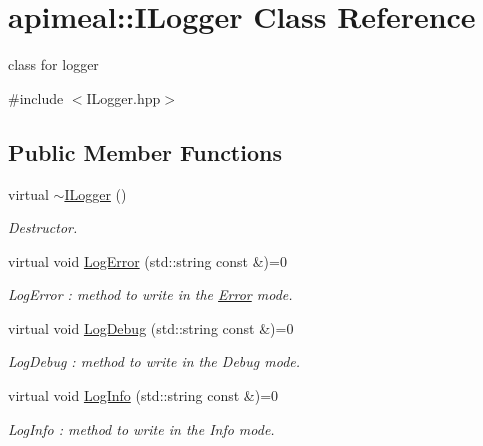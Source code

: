 \hypertarget{classapimeal_1_1ILogger}{\section{apimeal\-:\-:I\-Logger Class Reference}
\label{classapimeal_1_1ILogger}
}


class for logger  




{\ttfamily \#include $<$I\-Logger.\-hpp$>$}

\subsection*{Public Member Functions}
\begin{DoxyCompactItemize}
\item 
\hypertarget{classapimeal_1_1ILogger_acc7484a23738886326805dfca3988c68}{virtual \hyperlink{classapimeal_1_1ILogger_acc7484a23738886326805dfca3988c68}{$\sim$\-I\-Logger} ()}\label{classapimeal_1_1ILogger_acc7484a23738886326805dfca3988c68}

\begin{DoxyCompactList}\small\item\em Destructor. \end{DoxyCompactList}\item 
virtual void \hyperlink{classapimeal_1_1ILogger_a97fc60c8ddb4742f87b1748de911af84}{Log\-Error} (std\-::string const \&)=0
\begin{DoxyCompactList}\small\item\em Log\-Error \-: method to write in the \hyperlink{structapimeal_1_1Error}{Error} mode. \end{DoxyCompactList}\item 
virtual void \hyperlink{classapimeal_1_1ILogger_a414b28b54478aab3b1cbb790d92a6dec}{Log\-Debug} (std\-::string const \&)=0
\begin{DoxyCompactList}\small\item\em Log\-Debug \-: method to write in the Debug mode. \end{DoxyCompactList}\item 
virtual void \hyperlink{classapimeal_1_1ILogger_aede6672e65066b288d112ca52a99884b}{Log\-Info} (std\-::string const \&)=0
\begin{DoxyCompactList}\small\item\em Log\-Info \-: method to write in the Info mode. \end{DoxyCompactList}\end{DoxyCompactItemize}


